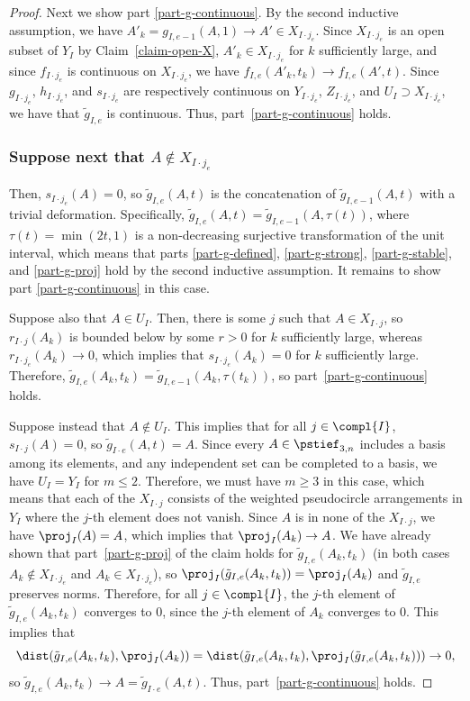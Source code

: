 \begin{proof}
Next we show part \eqref{part-g-continuous}.
By the second inductive assumption, we have $A'_k = g_{I,e-1}(A,1) \to A' \in X_{I\cdot j_e}$.
Since $X_{I\cdot j_e}$ is an open subset of $Y_I$ by Claim~\ref{claim-open-X}, $A'_k \in X_{I\cdot j_e}$ for $k$ sufficiently large, and since $f_{I\cdot j_e}$ is continuous on $X_{I\cdot j_e}$, we have $f_{I,e}(A'_k,t_k) \to f_{I,e}(A',t)$.
Since $g_{I\cdot j_e}$, $h_{I\cdot j_e}$, and $s_{I\cdot j_e}$ are respectively continuous on $Y_{I\cdot j_e}$, $Z_{I\cdot j_e}$, and $U_{I} \supset X_{I\cdot j_e}$, we have that $\tilde g_{I,e}$ is continuous. Thus, part~\eqref{part-g-continuous} holds.

\subsubsection*{Suppose next that $A \not\in X_{I\cdot j_e}$}

Then, $s_{I\cdot j_e}(A) = 0$, so $\tilde g_{I,e}(A,t)$ is the concatenation of $\tilde g_{I,e-1}(A,t)$ with a trivial deformation.
Specifically, $\tilde g_{I,e}(A,t) = \tilde g_{I,e-1}(A,\tau(t))$, where $\tau(t) = \min(2t,1)$
is a non-decreasing surjective transformation of the unit interval, which means that parts \eqref{part-g-defined}, \eqref{part-g-strong}, \eqref{part-g-stable}, and \eqref{part-g-proj} hold by the second inductive assumption. It remains to show part \eqref{part-g-continuous} in this case.

Suppose also that $A \in U_I$. Then, there is some $j$ such that $A \in X_{I\cdot j}$, so $r_{I\cdot j}(A_k)$ is bounded below by some $r > 0$ for $k$ sufficiently large, whereas $r_{I\cdot j_e}(A_k) \to 0$, which implies that $s_{I\cdot j_e}(A_k) = 0$ for $k$ sufficiently large. Therefore, $\tilde g_{I,e}(A_k,t_k) = \tilde g_{I,e-1}(A_k,\tau(t_k))$, so part~\eqref{part-g-continuous} holds.

Suppose instead that $A \not\in U_I$.
This implies that for all $j \in \compl{I}$, $s_{I\cdot j}(A) = 0$, so $\tilde g_{I\cdot e}(A,t) = A$.
Since every $A \in \pstief_{3,n}$ includes a basis among its elements, and any independent set can be completed to a basis, we have $U_I = Y_I$ for $m \leq 2$. Therefore, we must have $m \geq 3$ in this case, which means that each of the $X_{I\cdot j}$ consists of the weighted pseudocircle arrangements in $Y_I$ where the $j$-th element does not vanish. Since $A$ is in none of the $X_{I\cdot j}$, we have $\proj_I(A) = A$, which implies that $\proj_I(A_k) \to A$.
We have already shown that part~\eqref{part-g-proj} of the claim holds for $\tilde g_{I,e}(A_k,t_k)$ (in both cases $A_k \not\in X_{I\cdot j_e}$ and $A_k \in X_{I\cdot j_e}$), so $\proj_I(\tilde g_{I,e}(A_k,t_k)) = \proj_I(A_k)$ and $\tilde g_{I,e}$ preserves norms. Therefore, for all $j \in \compl{I}$, the $j$-th element of $\tilde g_{I,e}(A_k,t_k)$ converges to 0, since the $j$-th element of $A_k$ converges to 0. This implies that \[ \dist(\tilde g_{I,e}(A_k,t_k),\proj_I(A_k)) = \dist(\tilde g_{I,e}(A_k,t_k),\proj_I(\tilde g_{I,e}(A_k,t_k))) \to 0, \]
so $\tilde g_{I,e}(A_k,t_k) \to A = \tilde g_{I\cdot e}(A,t)$.
Thus, part~\eqref{part-g-continuous} holds.


\end{proof}
